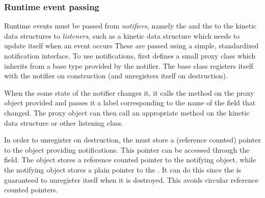 \subsubsection{Runtime event passing}

Runtime events must be passed from \textit{notifiers}, namely the
 and the  to the kinetic data structures to
\textit{listeners}, such as a kinetic data structure which needs to
update itself when an event occurs These are passed using a simple,
standardized notification interface. To use notifications, first
defines a small proxy class which inherits from a  base
type provided by the notifier. The  base class registers
itself with the notifier on construction (and unregisters itself on
destruction).

When the some state of the notifier changes it, it calls the
 method on the proxy object provided and passes
it a label corresponding to the name of the field that changed. The
proxy object can then call an appropriate method on the kinetic data
structure or other listening class.

In order to unregister on destruction, the  must store a
(reference counted) pointer to the object providing
notifications. This pointer can be accessed through the 
field. The  object stores a reference counted pointer to
the notifying object, while the notifying object stores a plain
pointer to the . It can do this since the 
is guaranteed to unregister itself when it is destroyed. This avoids
circular reference counted pointers.

